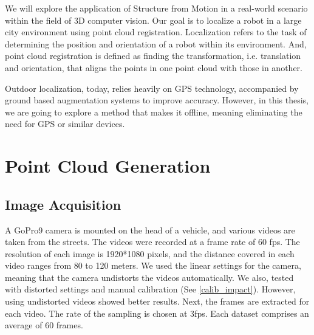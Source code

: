 \documentclass[11pt]{article}
\begin{document}
    We will explore the application of Structure from Motion in a real-world scenario within the field of 3D
    computer vision. Our goal is to localize a robot in a large city environment using point cloud registration.
    Localization refers to the task of determining the position and orientation of a robot within its environment.
    And, point cloud registration is defined as finding the transformation, i.e. translation and orientation,
    that aligns the points in one point cloud with those in another.

    Outdoor localization, today, relies heavily on GPS technology, accompanied by ground based augmentation systems
    to improve accuracy. However, in this thesis, we are going to explore a method that makes it offline, meaning
    eliminating the need for GPS or similar devices.

    \section{Point Cloud Generation}
    \subsection{Image Acquisition}
    A GoPro9 camera is mounted on the head of a vehicle, and various videos are taken from the streets.
    The videos were recorded at a frame rate of 60 fps. The resolution of each image is 1920*1080 pixels,
    and the distance covered in each video ranges from 80 to 120 meters. We used the linear settings for the camera,
    meaning that the camera undistorts the videos automatically. We also, tested with distorted settings and manual calibration
    (See \ref{calib_impact}). However, using undistorted videos showed better results. Next, the frames are extracted for each video.
    The rate of the sampling is chosen at 3fps. Each dataset comprises an average of 60 frames.
\end{document}
